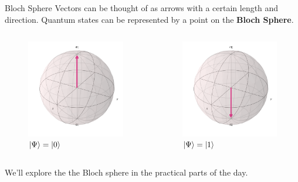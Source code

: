 \documentclass{beamer}
\begin{document}
\begin{frame}{Bloch Sphere}
    Vectors can be thought of as arrows with a certain length and direction.\vfill
    Quantum states can be represented by a point on the \textbf{Bloch Sphere}.\vfill

    \begin{columns}
        \begin{figure}
            \centering
            \includegraphics[width=0.8\columnwidth]{images/bloch+z.png}
            \caption{$\ket{\Psi}=\ket{0}$}
        \end{figure}
        \begin{figure}
            \centering
            \includegraphics[width=0.8\columnwidth]{images/bloch-z.png}
            \caption{$\ket{\Psi}=\ket{1}$}
        \end{figure}
    \end{columns}
    
    We'll explore the the Bloch sphere in the practical parts of the day. 
\end{frame}
\end{document}
